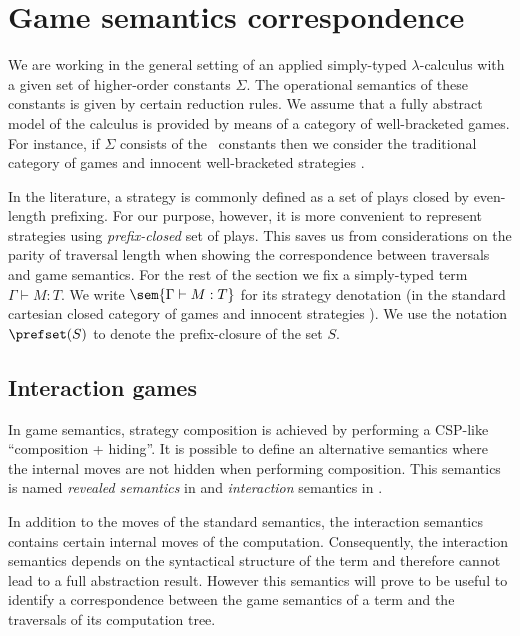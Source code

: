 




\section{Game semantics correspondence}
\label{sec:gamesemcorresp}

 We are working in the general setting of an applied
simply-typed $\lambda$-calculus with a given set of higher-order
constants $\Sigma$. The operational semantics of these constants is
given by certain reduction rules. We assume that a fully abstract
model of the calculus is provided by means of a category of
well-bracketed games. For instance, if $\Sigma$ consists
of the \pcf\ constants then we consider the traditional
category of games and innocent well-bracketed strategies
\cite{hylandong_pcf,abramsky94full}.


In the literature, a strategy is commonly defined as a set of plays closed by
even-length prefixing. For our purpose, however, it is more convenient to represent strategies using \emph{prefix-closed} set of plays. This saves us from considerations on the parity of traversal length when
showing the correspondence between traversals and game semantics.
 For the rest of the section we fix a simply-typed term $\Gamma \vdash M :T$. We write $\sem{\Gamma \vdash M : T}$ for its strategy denotation (in the standard cartesian closed category of games and innocent strategies \cite{abramsky94full, hylandong_pcf}). We use the notation $\prefset(S)$ to denote the prefix-closure of the set $S$.

\subsection{Interaction games}
\label{sec:interaction_semantics}

In game semantics, strategy composition is achieved by performing a
CSP-like ``composition + hiding''. It is possible to define an
alternative semantics where the internal moves are not hidden when
performing composition. This semantics is named \emph{revealed
semantics} in \cite{willgreenlandthesis} and \emph{interaction}
semantics in \cite{DBLP:conf/sas/DimovskiGL05}.

In addition to the moves of the standard semantics, the interaction
semantics contains certain internal moves of the computation.
Consequently, the interaction semantics depends on the syntactical
structure of the term and therefore cannot lead to a full
abstraction result. However this semantics will prove to be useful
to identify a correspondence between the game semantics of a term
and the traversals of its computation tree.

